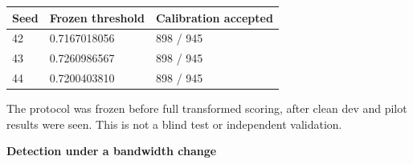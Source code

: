 \documentclass[10pt,a4paper]{article}
\newcommand{\reporttitle}[1]{{\color{navy}\Large\bfseries #1}\par\vspace{5pt}}
\begin{document}
\begin{center}\small

\begin{tabular}{@{}lll@{}}\toprule

Seed & Frozen threshold & Calibration accepted \\

\midrule

42 & 0.7167018056 & 898 / 945 \\

43 & 0.7260986567 & 898 / 945 \\

44 & 0.7200403810 & 898 / 945 \\

\bottomrule\end{tabular}\end{center}

{\small The protocol was frozen before full transformed scoring, after clean dev and pilot results were seen. This is not a blind test or independent validation.}\par

\clearpage

\reporttitle{Detection under a bandwidth change}
\end{document}
